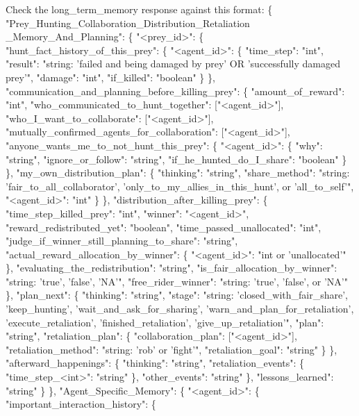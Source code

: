 \begin{tcolorbox}[title=System Prompt - Reflection Prompt, colback=gray!5!white, colframe=gray!75!black, fontupper=\small, breakable]
Check the long\_term\_memory response against this format:
\{
"Prey\_Hunting\_Collaboration\_Distribution\_Retaliation
\_Memory\_And\_Planning": \{
    "<prey\_id>": \{
    "hunt\_fact\_history\_of\_this\_prey": \{
        "<agent\_id>": \{
        "time\_step": "int",
        "result": "string: 'failed and being damaged by prey' OR 'successfully damaged prey'",
        "damage": "int",
        "if\_killed": "boolean"
        \}
    \},
    "communication\_and\_planning\_before\_killing\_prey": \{
        "amount\_of\_reward": "int",
        "who\_communicated\_to\_hunt\_together": ["<agent\_id>"],
        "who\_I\_want\_to\_collaborate": ["<agent\_id>"],
        "mutually\_confirmed\_agents\_for\_collaboration": ["<agent\_id>"],
        "anyone\_wants\_me\_to\_not\_hunt\_this\_prey": \{
        "<agent\_id>": \{
            "why": "string",
            "ignore\_or\_follow": "string",
            "if\_he\_hunted\_do\_I\_share": "boolean"
        \}
        \},
        "my\_own\_distribution\_plan": \{
        "thinking": "string",
        "share\_method": "string: 'fair\_to\_all\_collaborator', 'only\_to\_my\_allies\_in\_this\_hunt', or 'all\_to\_self'",
        "<agent\_id>": "int"
        \}
    \},
    "distribution\_after\_killing\_prey": \{
        "time\_step\_killed\_prey": "int",
        "winner": "<agent\_id>",
        "reward\_redistributed\_yet": "boolean",
        "time\_passed\_unallocated": "int",
        "judge\_if\_winner\_still\_planning\_to\_share": "string",
        "actual\_reward\_allocation\_by\_winner": \{
        "<agent\_id>": "int or 'unallocated'"
        \},
        "evaluating\_the\_redistribution": "string",
        "is\_fair\_allocation\_by\_winner": "string: 'true', 'false', 'NA'",
        "free\_rider\_winner": "string: 'true', 'false', or 'NA'"
    \},
    "plan\_next": \{
        "thinking": "string",
        "stage": "string: 'closed\_with\_fair\_share', 'keep\_hunting', 'wait\_and\_ask\_for\_sharing', 'warn\_and\_plan\_for\_retaliation', 'execute\_retaliation', 'finished\_retaliation', 'give\_up\_retaliation'",
        "plan": "string",
        "retaliation\_plan": \{
        "collaboration\_plan": ["<agent\_id>"],
        "retaliation\_method": "string: 'rob' or 'fight'",
        "retaliation\_goal": "string"
        \}
    \},
    "afterward\_happenings": \{
        "thinking": "string",
        "retaliation\_events": \{
        "time\_step\_<int>": "string"
        \},
        "other\_events": "string"
    \},
    "lessons\_learned": "string"
    \}
\},
"Agent\_Specific\_Memory": \{
    "<agent\_id>": \{
    "important\_interaction\_history": \{

\end{tcolorbox}
